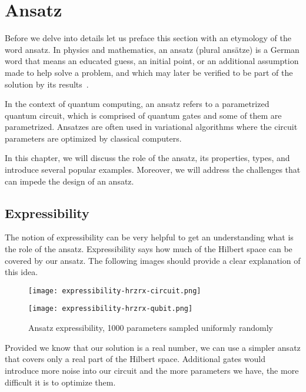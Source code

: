 \chapter{Ansatz}\label{ch:ansatz}
Before we delve into details let us preface this section with an etymology of the word ansatz. In physics and mathematics, an ansatz (plural ansätze) is a German word that means an educated guess, an initial point, or an additional assumption made to help solve a problem, and which may later be verified to be part of the solution by its results~\cite{ansatz_etymology}.

In the context of quantum computing, an ansatz refers to a parametrized quantum circuit, which is comprised of quantum gates and some of them are parametrized. Ansatzes are often used in variational algorithms where the circuit parameters are optimized by classical computers.

In this chapter, we will discuss the role of the ansatz, its properties, types, and introduce several popular examples. Moreover, we will address the challenges that can impede the design of an ansatz.

\section{Expressibility}
The notion of expressibility can be very helpful to get an understanding what is the role of the ansatz. Expressibility says how much of the Hilbert space can be covered by our ansatz. The following images should provide a clear explanation of this idea.

\begin{figure}[H]
        \centering
        \begin{minipage}{0.4\linewidth}
            \centering
            \texttt{[image: expressibility-hrzrx-circuit.png]}
        \end{minipage}
        \begin{minipage}{0.4\linewidth}
            \centering
            \texttt{[image: expressibility-hrzrx-qubit.png]}
        \end{minipage}
        \caption{Ansatz expressibility, 1000 parameters sampled uniformly randomly}
\end{figure}

Provided we know that our solution is a real number, we can use a simpler ansatz that covers only a real part of the Hilbert space. Additional gates would introduce more noise into our circuit and the more parameters we have, the more difficult it is to optimize them.

